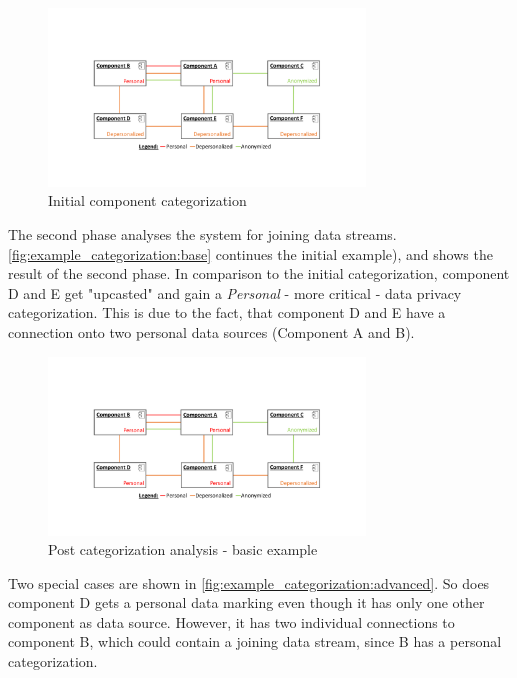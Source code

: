 \begin{figure}[h]
	\centering
	\includegraphics[trim = 35mm 40mm 40mm 45mm, clip, width=0.75\textwidth]{graphs/component_categorization_examples_initial}
	\caption{Initial component categorization}
	\label{fig:example_categorization:init}
\end{figure}

The second phase analyses the system for joining data streams. \autoref{fig:example_categorization:base} continues the initial example), and shows the result of the second phase. In comparison to the initial categorization, component D and E get "upcasted" and gain a \textit{Personal} - more critical - data privacy categorization. This is due to the fact, that component D and E have a connection onto two personal data sources (Component A and B).

\begin{figure}[h]
	\centering
	\includegraphics[trim = 35mm 40mm 40mm 45mm, clip, width=0.75\textwidth]{graphs/component_categorization_examples_upcast_base}
	\caption{Post categorization analysis - basic example}
	\label{fig:example_categorization:base}
\end{figure}

Two special cases are shown in \autoref{fig:example_categorization:advanced}. So does component D gets a personal data marking even though it has only one other component as data source. However, it has two individual connections to component B, which could contain a joining data stream, since B has a personal categorization.

